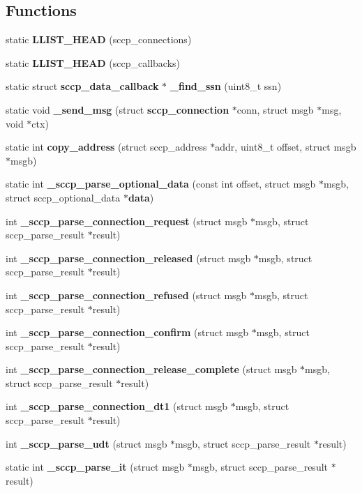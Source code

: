\subsection*{Functions}
\begin{DoxyCompactItemize}
\item 
static {\bf L\+L\+I\+S\+T\+\_\+\+H\+E\+AD} (sccp\+\_\+connections)
\item 
static {\bf L\+L\+I\+S\+T\+\_\+\+H\+E\+AD} (sccp\+\_\+callbacks)
\item 
static struct {\bf sccp\+\_\+data\+\_\+callback} $\ast$ {\bf \+\_\+find\+\_\+ssn} (uint8\+\_\+t ssn)
\item 
static void {\bf \+\_\+send\+\_\+msg} (struct {\bf sccp\+\_\+connection} $\ast$conn, struct msgb $\ast$msg, void $\ast$ctx)
\item 
static int {\bf copy\+\_\+address} (struct sccp\+\_\+address $\ast$addr, uint8\+\_\+t offset, struct msgb $\ast$msgb)
\item 
static int {\bf \+\_\+sccp\+\_\+parse\+\_\+optional\+\_\+data} (const int offset, struct msgb $\ast$msgb, struct sccp\+\_\+optional\+\_\+data $\ast${\bf data})
\item 
int {\bf \+\_\+sccp\+\_\+parse\+\_\+connection\+\_\+request} (struct msgb $\ast$msgb, struct sccp\+\_\+parse\+\_\+result $\ast$result)
\item 
int {\bf \+\_\+sccp\+\_\+parse\+\_\+connection\+\_\+released} (struct msgb $\ast$msgb, struct sccp\+\_\+parse\+\_\+result $\ast$result)
\item 
int {\bf \+\_\+sccp\+\_\+parse\+\_\+connection\+\_\+refused} (struct msgb $\ast$msgb, struct sccp\+\_\+parse\+\_\+result $\ast$result)
\item 
int {\bf \+\_\+sccp\+\_\+parse\+\_\+connection\+\_\+confirm} (struct msgb $\ast$msgb, struct sccp\+\_\+parse\+\_\+result $\ast$result)
\item 
int {\bf \+\_\+sccp\+\_\+parse\+\_\+connection\+\_\+release\+\_\+complete} (struct msgb $\ast$msgb, struct sccp\+\_\+parse\+\_\+result $\ast$result)
\item 
int {\bf \+\_\+sccp\+\_\+parse\+\_\+connection\+\_\+dt1} (struct msgb $\ast$msgb, struct sccp\+\_\+parse\+\_\+result $\ast$result)
\item 
int {\bf \+\_\+sccp\+\_\+parse\+\_\+udt} (struct msgb $\ast$msgb, struct sccp\+\_\+parse\+\_\+result $\ast$result)
\item 
static int {\bf \+\_\+sccp\+\_\+parse\+\_\+it} (struct msgb $\ast$msgb, struct sccp\+\_\+parse\+\_\+result $\ast$result)

\end{DoxyCompactItemize}
